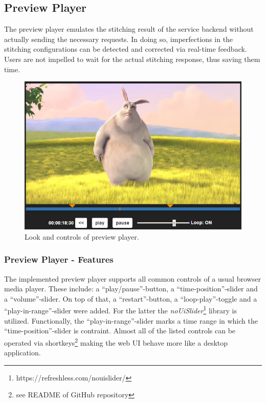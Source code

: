 \documentclass[conference]{IEEEtran}
\begin{document}
\subsection{Preview Player}
The preview player emulates the stitching result of the service backend without actually sending the necessary requests.
In doing so, imperfections in the stitching configurations can be detected and corrected via real-time feedback.
Users are not impelled to wait for the actual stitching response, thus saving them time.
\begin{figure}[H]
\centering
\includegraphics[scale=0.5]{preview_player.png}
\caption{Look and controls of preview player.}
\end{figure}
\subsubsection{Preview Player - Features}
The implemented preview player supports all common controls of a usual browser media player.
These include: a ``play/pause''-button, a ``time-position''-slider and a ``volume''-slider.
On top of that, a ``restart''-button, a ``loop-play''-toggle and a ``play-in-range''-slider were added.
For the latter the \textit{noUiSlider}\footnote{https://refreshless.com/nouislider/} library is utilized.
Functionally, the ``play-in-range''-slider marks a time range in which the ``time-position''-slider is contraint.
Almost all of the listed controls can be operated via shortkeys\footnote{see README of GitHub repository} making the web UI behave more like a desktop application.
\\
\end{document}
